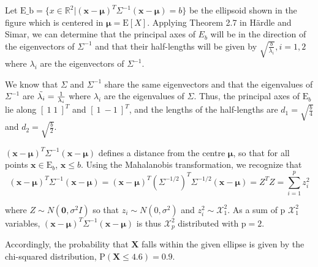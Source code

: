 Let $\text{E_b} = \{ x \in \mathbb{R}^2 | (\mathbf{x}- \mathbf{\mu})^T\Sigma^{-1} (\mathbf{x}- \mathbf{\mu}) = b \}$ be the ellipsoid shown in the figure which is centered in $\mathbf{\mu} = \text{E}[X]$. Applying Theorem 2.7 in Härdle and Simar, we can determine that the principal axes of $E_b$ will be in the direction of the eigenvectors of $\Sigma^{-1}$ and that their half-lengths will be given by $\sqrt{\frac{b}{\lambda_i}}, i =1,2$ where $\lambda_i$ are the eigenvectors of $\Sigma^{-1}$.  

We know that $\Sigma$ and $\Sigma^{-1}$ share the same eigenvectors and that the eigenvalues of $\Sigma^{-1}$ are  $\Tilde{\lambda_i}= \frac{1}{{\lambda_i}}$ where $\lambda_i$ are the eigenvalues of $\Sigma$. 
Thus, the principal axes of $\text{E}_b$ lie along $[\: 1 \;  1\: ]^T$ and $[\: 1 \ -1\:]^T$, and the lengths of the half-lengths are $d_1 = \sqrt{\frac{b}{4}}$ and $d_2 = \sqrt{\frac{b}{2}}$.


$(\mathbf{x}- \mathbf{\mu})^T\Sigma^{-1} (\mathbf{x}- \mathbf{\mu})$ defines a distance from the centre $\mathbf{\mu}$, so that for all points $\mathbf{x} \in \text{E}_b$, $\mathbf{x} \leq b$. 
Using the Mahalanobis transformation, we recognize that 
\begin{equation*}
    (\mathbf{x}- \mathbf{\mu})^T\Sigma^{-1} (\mathbf{x}- \mathbf{\mu})
    = (\mathbf{x}- \mathbf{\mu})^T(\Sigma^{-1/2})^T\Sigma^{-1/2}(\mathbf{x}- \mathbf{\mu}) = Z^TZ = \sum_{i=1}^p z_i^2
\end{equation*}

where $Z \sim N(\mathbf{0}, \sigma^2 I)$ so that $z_i \sim N(0,\sigma^2)$ and $z_i^2 \sim \mathcal{X}_1^2$. As a sum of p $\mathcal{X}_1^2$ variables, $(\mathbf{x}- \mathbf{\mu})^T\Sigma^{-1} (\mathbf{x}- \mathbf{\mu})$ is thus $\mathcal{X}_p^2$ distributed with $\text{p}=2$. %

Accordingly, the probability that $\mathbf{X}$ falls within the given ellipse is given by the chi-squared distribution, $\text{P}(\mathbf{X} \leq 4.6) = 0.9$.